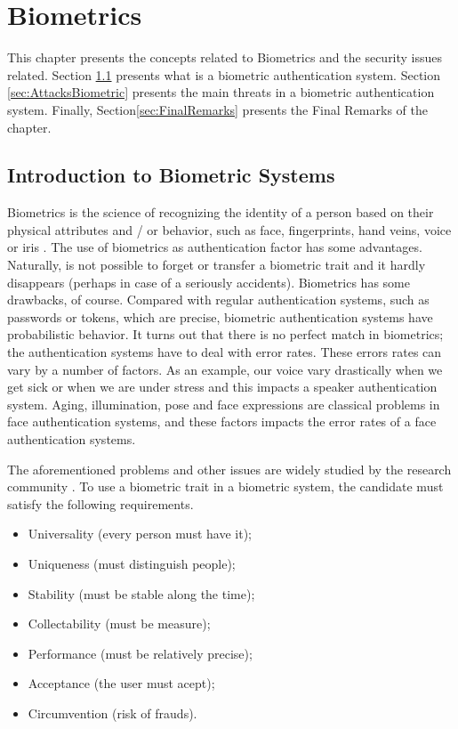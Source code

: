 \chapter{Biometrics}
\label{chap:Biometrics}

This chapter presents the concepts related to Biometrics and the security issues related. Section \ref{sec:IntroBiome} presents what is a biometric authentication system. Section \ref{sec:AttacksBiometric} presents the main threats in a biometric authentication system. Finally, Section\ref{sec:FinalRemarks} presents the Final Remarks of the chapter.

\section{Introduction to Biometric Systems}
\label{sec:IntroBiome}

Biometrics is the science of recognizing the identity of a person based on their physical attributes and / or behavior, such as face, fingerprints, hand veins, voice or iris \cite{li2011handbook}. The use of biometrics as authentication factor has some advantages. Naturally, is not possible to forget or transfer a biometric trait and it hardly disappears (perhaps in case of a seriously accidents). Biometrics has some drawbacks, of course. Compared with regular authentication systems, such as passwords or tokens, which are precise, biometric authentication systems have probabilistic behavior. It turns out that there is no perfect match in biometrics; the authentication systems have to deal with error rates. These errors rates can vary by a number of factors. As an example, our voice vary drastically  when we get sick or when we are under stress and this impacts a speaker authentication system. Aging, illumination, pose and face expressions are classical problems in face authentication systems, and these factors impacts the error rates of a face authentication systems. 

The aforementioned problems and other issues are widely studied by the research community \cite{flynn2008handbook}. To use a biometric trait in a biometric system, the candidate must satisfy the following requirements.

\begin{itemize}
        \item Universality (every person must have it);
        \item Uniqueness (must distinguish people);
        \item Stability (must be stable along the time);
        \item Collectability (must be measure);
        \item Performance (must be relatively precise);
        \item Acceptance (the user must acept);
        \item Circumvention (risk of frauds).
\end{itemize}

